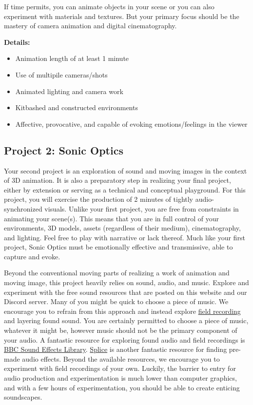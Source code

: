 If time permits, you can animate objects in your scene or you can also experiment with materials and textures. But your primary focus should be the mastery of camera animation and digital cinematography.

\textbf{Details:}
\begin{itemize}
	\tightlist
	\item Animation length of at least 1 minute
	\item Use of multipile cameras/shots
	\item Animated lighting and camera work
	\item Kitbashed and constructed environments
	\item Affective, provocative, and capable of evoking emotions/feelings in the viewer
\end{itemize}

\hypertarget{project2}{%
	\subsection{Project 2: Sonic Optics}}
Your second project is an exploration of sound and moving images in the context of 3D animation. It is also a preparatory step in realizing your final project, either by extension or serving as a technical and conceptual playground. For this project, you will exercise the production of 2 minutes of tightly audio-synchronized visuals. Unlike your first project, you are free from constraints in animating your scene(s). This means that you are in full control of your environments, 3D models, assets (regardless of their medium), cinematography, and lighting. Feel free to play with narrative or lack thereof. Much like your first project, Sonic Optics must be emotionally effective and transmissive, able to capture and evoke.

Beyond the conventional moving parts of realizing a work of animation and moving image, this project heavily relies on sound, audio, and music. Explore and experiment with the free sound resources that are posted on this website and our Discord server. Many of you might be quick to choose a piece of music. We encourage you to refrain from this approach and instead explore \href{https://en.wikipedia.org/wiki/Field_recording}{field recording} and layering found sound. You are certainly permitted to choose a piece of music, whatever it might be, however music should not be the primary component of your audio. A fantastic resource for exploring found audio and field recordings is \href{http://bbcsfx.acropolis.org.uk/}{BBC Sound Effects Library}. \href{https://splice.com/}{Splice} is another fantastic resource for finding pre-made audio effects. Beyond the available resources, we encourage you to experiment with field recordings of your own. Luckily, the barrier to entry for audio production and experimentation is much lower than computer graphics, and with a few hours of experimentation, you should be able to create enticing soundscapes.

